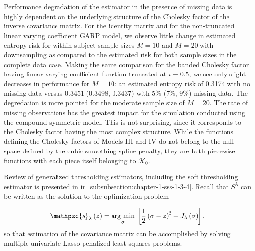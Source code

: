 \bigskip

Performance degradation of the estimator in the presence of missing data is highly dependent on the underlying structure of the Cholesky factor of the inverse covariance matrix. For the identity matrix and for the non-truncated linear varying coefficient GARP model, we observe little change in estimated entropy risk for within subject sample sizes $M = 10$ and $M = 20$ with downsampling as compared to the estimated risk for both sample sizes in the complete data case. Making the same comparison for the banded Cholesky factor having linear varying coefficient function truncated at $t = 0.5$, we see only slight decreases in performance for $M = 10$: an estimated entropy risk of 0.3174  with no missing data versus 0.3451 (0.3498, 0.3437) with $5\%$ ($7\%$, $9\%$) missing data. The degredation is more pointed for the moderate sample size of $M = 20$. The rate of missing observations has the greatest impact for the simulation conducted using the compound symmetric model. This is not surprising, since it corresponds to the Cholesky factor having the most complex structure. While the functions defining the Cholesky factors of Models III and IV do not belong to the null space defined by the cubic smoothing spline penalty, they are both piecewise functions with each piece itself belonging to $\mathcal{H}_0$.

\bigskip

{}

\bigskip

{}

\bigskip

Review of generalized thresholding estimators, including the soft thresholding estimator is presented in in \ref{subsubsection:chapter-1-sss-1-3-4}. Recall that  $S^\lambda$ can be written as the solution to the optimization problem

\begin{equation} \label{eq:soft-thresholding-objective-function}
\mathpzc{s}_\lambda\left( z \right)  = \argmin{\sigma} \left[ \frac{1}{2} \left(\sigma - z\right)^2 + J_\lambda\left(\sigma \right)\right],
\end{equation}
\noindent
so that estimation of the covariance matrix can be accomplished by solving multiple univariate Lasso-penalized least squares problems. 

